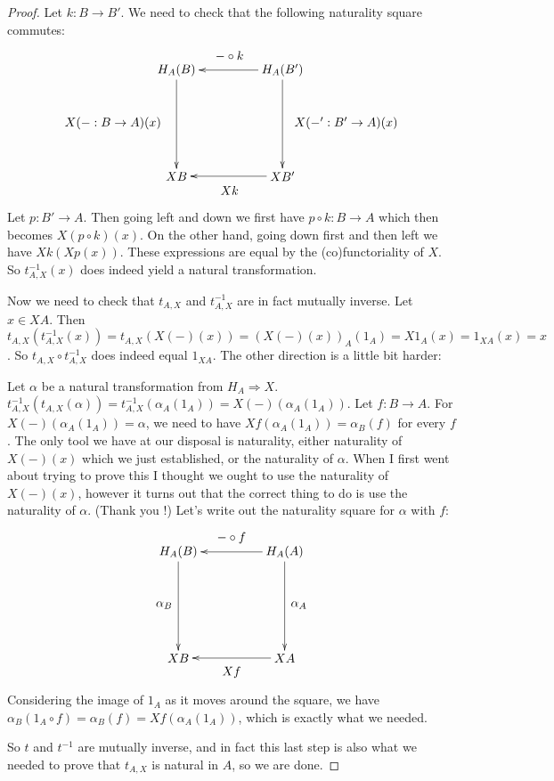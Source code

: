 \documentclass[11pt]{article}
\theoremstyle{definition}
\theoremstyle{definition}
\theoremstyle{plain}
\theoremstyle{plain}
\theoremstyle{plain}
\begin{document}
\begin{proof}
Let $k: B \to B'$. We need to check that the following naturality square commutes:

\begin{equation*}
\begin{xy}
(0,0)*+{H_A(B)}="v1"; (30,0)*+{H_A(B')}="v2"; (0,-30)*+{XB}="v3"; (30,-30)*+{XB'}="v4";
{\ar "v2";"v1"}?*!/^4mm/{- \circ k};
{\ar "v1";"v3"}?*!/^18mm/{X(-:B \to A)(x)};
{\ar "v2";"v4"}?*!/_18mm/{X(-':B' \to A)(x)};
{\ar "v4";"v3"}?*!/_4mm/{Xk};
\end{xy}
\end{equation*}

Let $p: B' \to A$. Then going left and down we first have $p \circ k: B \to A$ which then becomes $X(p \circ k)(x)$. On the other hand, going down first and then left we have $Xk(Xp(x))$. These expressions are equal by the (co)functoriality of $X$. So $t_{A,X}^{-1}(x)$ does indeed yield a natural transformation.

Now we need to check that $t_{A,X}$ and $t_{A,X}^{-1}$ are in fact mutually inverse. Let $x \in XA$. Then $t_{A,X}(t_{A,X}^{-1}(x)) = t_{A,X}(X(-)(x)) = (X(-)(x))_A(1_A) = X1_A(x) = 1_{XA}(x)=x$. So $t_{A,X} \circ t_{A,X}^{-1}$ does indeed equal $1_{XA}$. The other direction is a little bit harder:

Let $\alpha$ be a natural transformation from $H_A \Rightarrow X$. $t_{A,X}^{-1}(t_{A,X}(\alpha)) = t_{A,X}^{-1}(\alpha_A(1_A)) = X(-)(\alpha_A(1_A))$. Let $f: B \to A$. For $X(-)(\alpha_A(1_A)) = \alpha$, we need to have $Xf(\alpha_A(1_A)) = \alpha_B(f)$ for every $f$. The only tool we have at our disposal is naturality, either naturality of $X(-)(x)$ which we just established, or the naturality of $\alpha$. When I first went about trying to prove this I thought we ought to use the naturality of $X(-)(x)$, however it turns out that the correct thing to do is use the naturality of $\alpha$. (Thank you \cite{leinster_basic_2014}!) Let's write out the naturality square for $\alpha$ with $f$:

\begin{equation*}
\begin{xy}
(0,0)*+{H_A(B)}="v1"; (30,0)*+{H_A(A)}="v2"; (0,-30)*+{XB}="v3"; (30,-30)*+{XA}="v4";
{\ar "v2";"v1"}?*!/^4mm/{- \circ f};
{\ar "v1";"v3"}?*!/^4mm/{\alpha_B};
{\ar "v2";"v4"}?*!/_4mm/{\alpha_A};
{\ar "v4";"v3"}?*!/_4mm/{Xf};
\end{xy}
\end{equation*}

Considering the image of $1_A$ as it moves around the square, we have $\alpha_B(1_A \circ f) = \alpha_B(f) = Xf(\alpha_A(1_A))$, which is exactly what we needed.

So $t$ and $t^{-1}$ are mutually inverse, and in fact this last step is also what we needed to prove that $t_{A,X}$ is natural in $A$, so we are done.
\end{proof}
\end{document}
